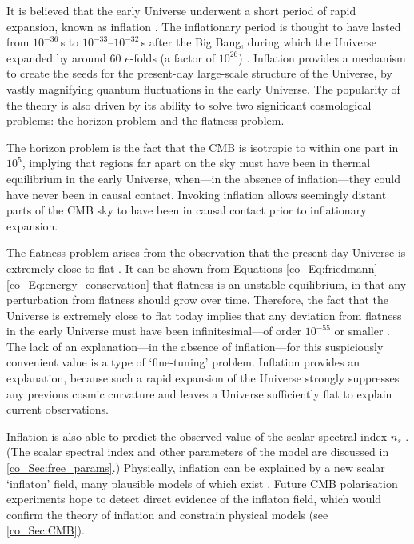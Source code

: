 It is believed that the early Universe underwent a short period of rapid expansion, known as inflation \citep{Guth1981, Guth1982, Starobinsky1982,  Linde1982, Linde1983}. The inflationary period is thought to have lasted from $10^{-36}$\,s to $10^{-33}$--$10^{-32}$\,s after the Big Bang, during which the Universe expanded by around 60 $e$-folds (a factor of $10^{26}$) \citep{Planck2018X}. Inflation provides a mechanism to create the seeds for the present-day large-scale structure of the Universe, by vastly magnifying quantum fluctuations in the early Universe. The popularity of the theory is also driven by its ability to solve two significant cosmological problems: the horizon problem and the flatness problem.

The horizon problem is the fact that the CMB is isotropic to within one part in $10^5$, implying that regions far apart on the sky must have been in thermal equilibrium in the early Universe, when---in the absence of inflation---they could have never been in causal contact. Invoking inflation allows seemingly distant parts of the CMB sky to have been in causal contact prior to inflationary expansion.

The flatness problem arises from the observation that the present-day Universe is extremely close to flat \citep{Planck2018VI}. It can be shown from Equations \eqref{co_Eq:friedmann}--\eqref{co_Eq:energy_conservation} that flatness is an unstable equilibrium, in that any perturbation from flatness should grow over time. Therefore, the fact that the Universe is extremely close to flat today implies that any deviation from flatness in the early Universe must have been infinitesimal---of order $10^{-55}$ or smaller \citep{Guth1981}. The lack of an explanation---in the absence of inflation---for this suspiciously convenient value is a type of `fine-tuning' problem. Inflation provides an explanation, because such a rapid expansion of the Universe strongly suppresses any previous cosmic curvature and leaves a Universe sufficiently flat to explain current observations.

Inflation is also able to predict the observed value of the scalar spectral index $n_s$ \citep{Bardeen1983, Planck2018X}. (The scalar spectral index and other parameters of the \lcdm{} model are discussed in \autoref{co_Sec:free_params}.) Physically, inflation can be explained by a new scalar `inflaton' field, many plausible models of which exist \citep[e.g.][for a review]{Bauman2015}. Future CMB polarisation experiments hope to detect direct evidence of the inflaton field, which would confirm the theory of inflation and constrain physical models (see \autoref{co_Sec:CMB}).

